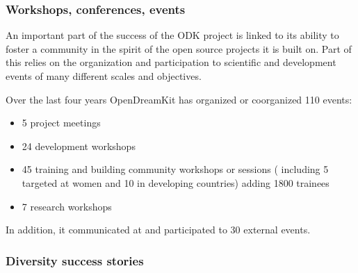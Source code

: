\subsubsection{Workshops, conferences, events}


An important part of the success of the ODK project is linked to its
ability to foster a community in the spirit of the open source
projects it is built on. Part of this relies on the organization and
participation to scientific and development events of many different
scales and objectives.

Over the last four years OpenDreamKit has organized or coorganized 110
events:
\begin{itemize}
\item 5 project meetings
\item 24 development workshops
\item 45 training and building community workshops or sessions 
( including 5 targeted at women and 10 in developing countries) adding 1800 trainees
\item 7 research workshops
\end{itemize}
In addition, it communicated at and participated to 30 external events.

\subsubsection{Diversity success stories}


